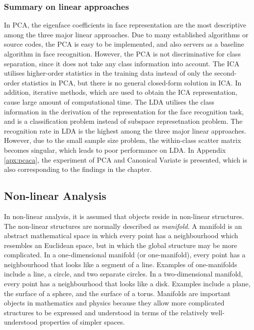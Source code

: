 \subsubsection{Summary on linear approaches}
In PCA, the eigenface coefficients in face representation are the most descriptive among the three major linear approaches. Due to many established algorithms or source codes, the PCA is easy to be implemented, and also servers as a baseline algorithm in face recognition. However, the PCA is not discriminative for class separation, since it does not take any class information into account. The ICA utilises higher-order statistics in the training data instead of only the second-order statistics in PCA, but there is no general closed-form solution in ICA. In addition, iterative methods, which are used to obtain the ICA representation, cause large amount of computational time. The LDA utilises the class information in the derivation of the representation for the face recognition task, and is a classification problem instead of subspace represetnation problem. The recognition rate in LDA is the highest among the three major linear approaches. However, due to the small sample size problem, the within-class scatter matrix becomes singular, which leads to poor performance on LDA. In \mbox{Appendix} \ref{apx:pcaca}, the experiment of PCA and Canonical Variate is presented, which is also corresponding to the findings in the chapter. 


\subsection{Non-linear Analysis}
In non-linear analysis, it is assumed that objects reside in non-linear structures. The non-linear structures are normally described as \textit{manifold}. A manifold is an abstract mathematical space in which every point has a neighbourhood which resembles an Euclidean space, but in which the global structure may be more complicated. In a one-dimensional manifold (or one-manifold), every point has a neighbourhood that looks like a segment of a line. Examples of one-manifolds include a line, a circle, and two separate circles. In a two-dimensional manifold, every point has a neighbourhood that looks like a disk. Examples include a plane, the surface of a sphere, and the surface of a torus. Manifolds are important objects in mathematics and physics because they allow more complicated structures to be expressed and understood in terms of the relatively well-understood properties of simpler spaces.

